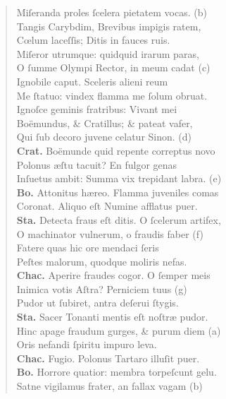 \documentclass[a4paper,12pt]{article}
\begin{document}
\begin{verse}
Miſeranda proles ſcelera pietatem vocas. (b)\footnotemark\\[0pt]
Tangis Carybdim, Brevibus impigis ratem,\\[0pt]
Cœlum laceſſis; Ditis in fauces ruis.\\[0pt]
Miſeror utrumque: quidquid irarum paras,\\[0pt]
O ſumme Olympi Rector, in meum cadat (c)\footnotemark\\[0pt]
Ignobile caput. Sceleris alieni reum\\[0pt]
Me ſtatuo: vindex flamma me ſolum obruat.\\[0pt]
Ignoſce geminis fratribus: Vivant mei\\[0pt]
Boëmundus, \& Cratillus; \& pateat vafer,\\[0pt]
Qui ſub decoro juvene celatur Sinon. (d)\footnotemark\\[0pt]
\textbf{Crat.} Boëmunde quid repente correptus novo\\[0pt]
Polonus æſtu tacuit? En fulgor genas\\[0pt]
Inſuetus ambit: Summa vix trepidant labra. (e)\footnotemark\\[0pt]
\textbf{Bo.} Attonitus hæreo. Flamma juveniles comas\\[0pt]
Coronat. Aliquo eſt Numine afflatus puer.\\[0pt]
\textbf{Sta.} Detecta fraus eſt ditis. O ſcelerum artifex,\\[0pt]
O machinator vulnerum, o fraudis faber (f)\footnotemark\\[0pt]
Fatere quas hic ore mendaci ſeris\\[0pt]
Peſtes malorum, quodque moliris nefas.\\[0pt]
\textbf{Chac.} Aperire fraudes cogor. O ſemper meis\\[0pt]
Inimica votis Aſtra? Perniciem tuus (g)\footnotemark\\[0pt]
Pudor ut ſubiret, antra deſerui ſtygis.\\[0pt]
\textbf{Sta.} Sacer Tonanti mentis eſt noſtræ pudor.\\[0pt]
Hinc apage fraudum gurges, \& purum diem (a)\footnotemark\\[0pt]
Oris nefandi ſpiritu impuro leva.\\[0pt]
\textbf{Chac.} Fugio. Polonus Tartaro illuſit puer.\\[0pt]
\textbf{Bo.} Horrore quatior: membra torpeſcunt gelu.\\[0pt]
Satne vigilamus frater, an fallax vagam (b)\footnotemark\\[0pt]

\end{verse}
\end{document}
